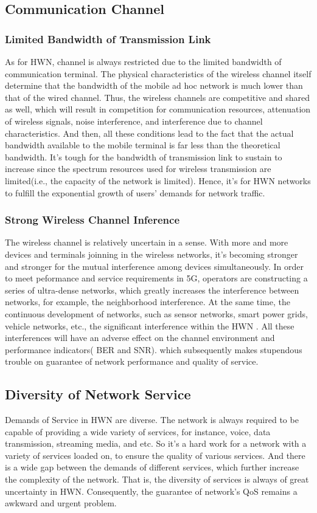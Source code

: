 \documentclass[journal,comsoc]{IEEEtran}
\begin{document}
	\subsection{Communication Channel}
	\subsubsection{Limited Bandwidth of Transmission Link}
	As for HWN, channel is always restricted due to the limited bandwidth of communication terminal.
	The physical characteristics of the wireless channel itself determine that the bandwidth of the mobile ad hoc network 
	is much lower than that of the wired channel. 
	Thus, the wireless channels are competitive and shared as well, which will result in competition for communication resources, 
	attenuation of wireless signals, noise interference, and interference due to channel characteristics.
	And then, all these conditions lead to the fact that the actual bandwidth available to the mobile terminal is far less than the theoretical bandwidth.
	It's tough for the bandwidth of transmission link to sustain to increase since the spectrum resources used for wireless transmission are limited(i.e., the capacity of the network is limited).
	Hence, it's  for HWN networks to fulfill the exponential growth of users' demands for network traffic.
	
	\subsubsection{Strong Wireless Channel Inference}
	The wireless channel is relatively uncertain in a sense.
	With more and more devices and terminals joinning in the wireless networks, it's becoming stronger and stronger for the mutual interference among devices simultaneously.
	In order to meet peformance and service requirements in 5G, operators are constructing a series of ultra-dense networks, 
	which greatly increases the interference between networks, for example, the neighborhood interference.
	At the same time, the continuous development of networks, such as sensor networks, smart power grids, vehicle networks, etc., 
	the significant interference within the HWN . 
	All these interferences will have an adverse effect on the channel environment and performance indicators( BER and SNR). 
	which subsequently makes stupendous trouble on guarantee of network performance and quality of service.
	
	\subsection{Diversity of Network Service}
	Demands of Service in HWN are diverse. 
	The network is always required to be capable of providing a wide variety of services, for instance, voice, data transmission, streaming media, and etc.
	So it's a hard work for a network with a variety of services loaded on, to ensure the quality of various services.
	And there is a wide gap between the demands of different services, which further increase the complexity of the network.
	That is, the diversity of services is always of great uncertainty in HWN.
	Consequently, the guarantee of network's QoS remains a awkward and urgent problem.
	
\end{document}
